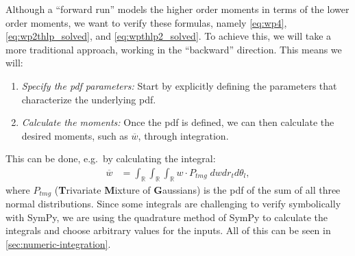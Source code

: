Although a \enquote{forward run} models the higher order moments in terms of the lower order moments,
we want to verify these formulas,
namely \cref{eq:wp4}, \cref{eq:wp2thlp_solved}, and \cref{eq:wpthlp2_solved}.
To achieve this, we will take a more traditional approach, working in the \enquote{backward} direction.
This means we will:
\begin{enumerate}
    \item \emph{Specify the \gls{pdf} parameters:}
    Start by explicitly defining the parameters that characterize the underlying \gls{pdf}.
    \item \emph{Calculate the moments:}
    Once the \gls{pdf} is defined, we can then calculate the desired moments,
    such as $\overline{w}$, through integration.
\end{enumerate}
This can be done, e.g.\ by calculating the integral:
\begin{align}
    \overline{w}
    &= \int_{\mathbb{R}} \int_{\mathbb{R}} \int_{\mathbb{R}} w \cdot P_{tmg} \; dw dr_t d\theta_l,
\end{align}
where $P_{tmg}$ (\textbf{T}rivariate \textbf{M}ixture of \textbf{G}aussians)
is the \gls{pdf} of the sum of all three normal distributions.
Since some integrals are challenging to verify symbolically with SymPy,
we are using the quadrature method of SymPy to calculate the integrals
and choose arbitrary values for the inputs.
All of this can be seen in \cref{sec:numeric-integration}.
